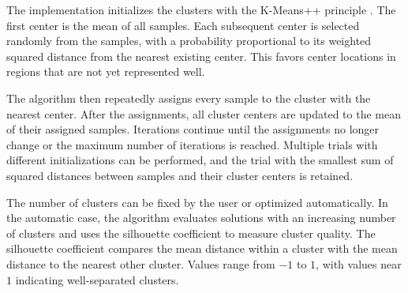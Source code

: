 The implementation initializes the clusters with the K-Means++ principle \cite{Arthur2007}.
The first center is the mean of all samples.
Each subsequent center is selected randomly from the samples, with a probability proportional to its weighted squared distance from the nearest existing center.
This favors center locations in regions that are not yet represented well.

The algorithm then repeatedly assigns every sample to the cluster with the nearest center.
After the assignments, all cluster centers are updated to the mean of their assigned samples.
Iterations continue until the assignments no longer change or the maximum number of iterations is reached.
Multiple trials with different initializations can be performed, and the trial with the smallest sum of squared distances between samples and their cluster centers is retained.

The number of clusters can be fixed by the user or optimized automatically.
In the automatic case, the algorithm evaluates solutions with an increasing number of clusters and uses the silhouette coefficient \cite{Rousseeuw1987} to measure cluster quality.
The silhouette coefficient compares the mean distance within a cluster with the mean distance to the nearest other cluster.
Values range from $-1$ to $1$, with values near $1$ indicating well-separated clusters.
